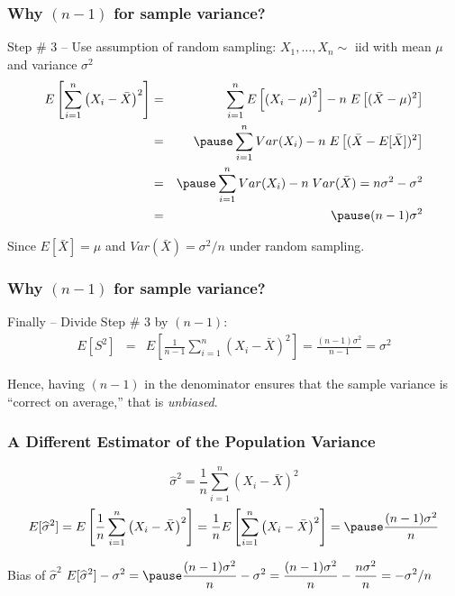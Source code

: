 \begin{frame}
\frametitle{Why $(n-1)$ for sample variance?}
\begin{block}{Step \# 3 -- Use assumption of random sampling:}
\alert{$X_1, \hdots, X_n \sim \mbox{ iid}$ with mean $\mu$ and variance $\sigma^2$}
	\begin{eqnarray*}
		E\left[\sum_{i=1}^n \left(X_i - \bar{X}\right)^2\right] &=&  \sum_{i=1}^n E\left[\left(X_i - \mu\right)^2\right] -n\;E\left[ (\bar{X}-\mu)^2\right]\\
		&=&  \pause \sum_{i=1}^n Var(X_i) -n\;E\left[ (\bar{X}-E[\bar{X}])^2\right]\\
		&=& \pause   \sum_{i=1}^n Var(X_i) -n\;Var(\bar{X})= n\sigma^2 - \sigma^2\\
		&=& \pause (n-1)\sigma^2
	\end{eqnarray*}
\end{block}
\alert{Since $E[\bar{X}]=\mu$ and $Var(\bar{X})=\sigma^2/n$ under random sampling.}
\end{frame}

\begin{frame}
\frametitle{Why $(n-1)$ for sample variance?}
\begin{block}{Finally -- Divide Step \# 3 by $(n-1)$:}
	\begin{eqnarray*}
		E[S^2] &=& E\left[\frac{1}{n-1}\sum_{i=1}^n \left(X_i - \bar{X}\right)^2\right]= \frac{(n-1)\sigma^2}{n-1} = \sigma^2
	\end{eqnarray*}
\end{block}
\alert{Hence, having $(n-1)$ in the denominator ensures that the sample variance is ``correct on average,'' that is \emph{unbiased}.}
\end{frame}
\begin{frame}
\frametitle{A Different Estimator of the Population Variance}

$$\widehat{\sigma}^2 = \frac{1}{n}\sum_{i=1}^n \left(X_i - \bar{X}\right)^2$$
\pause
\begin{eqnarray*}
E[\widehat{\sigma}^2 ] = E\left[\frac{1}{n}\sum_{i=1}^n \left(X_i - \bar{X}\right)^2  \right]= \frac{1}{n} E\left[\sum_{i=1}^n \left(X_i - \bar{X}\right)^2\right] = \pause \frac{(n-1)\sigma^2}{n} 
\end{eqnarray*}

\begin{block}{Bias of $\widehat{\sigma}^2$}
\vspace{0.75em}
$\displaystyle E[\widehat{\sigma}^2 ] - \sigma^2 = \pause \frac{(n-1)\sigma^2}{n}  - \sigma^2 = \frac{(n-1)\sigma^2}{n}  - \frac{n\sigma^2}{n} = -\sigma^2/n$
\end{block}
\end{frame}
